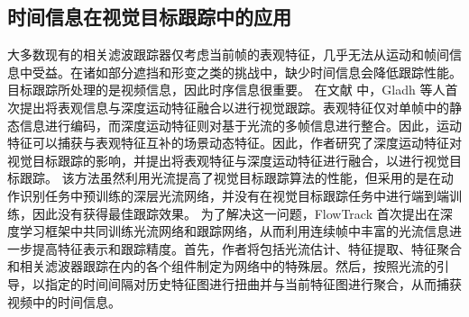 \subsection{时间信息在视觉目标跟踪中的应用}
大多数现有的相关滤波跟踪器仅考虑当前帧的表观特征，几乎无法从运动和帧间信息中受益。在诸如部分遮挡和形变之类的挑战中，缺少时间信息会降低跟踪性能。目标跟踪所处理的是视频信息，因此时序信息很重要。
在文献 \cite{DeepMotion} 中，Gladh 等人首次提出将表观信息与深度运动特征融合以进行视觉跟踪。表观特征仅对单帧中的静态信息进行编码，而深度运动特征则对基于光流的多帧信息进行整合。因此，运动特征可以捕获与表观特征互补的场景动态特征。因此，作者研究了深度运动特征对视觉目标跟踪的影响，并提出将表观特征与深度运动特征进行融合，以进行视觉目标跟踪。
该方法虽然利用光流提高了视觉目标跟踪算法的性能，但采用的是在动作识别任务中预训练的深层光流网络，并没有在视觉目标跟踪任务中进行端到端训练，因此没有获得最佳跟踪效果。
为了解决这一问题，FlowTrack \cite{FlowTrack} 首次提出在深度学习框架中共同训练光流网络和跟踪网络，从而利用连续帧中丰富的光流信息进一步提高特征表示和跟踪精度。首先，作者将包括光流估计、特征提取、特征聚合和相关滤波器跟踪在内的各个组件制定为网络中的特殊层。然后，按照光流的引导，以指定的时间间隔对历史特征图进行扭曲并与当前特征图进行聚合，从而捕获视频中的时间信息。

